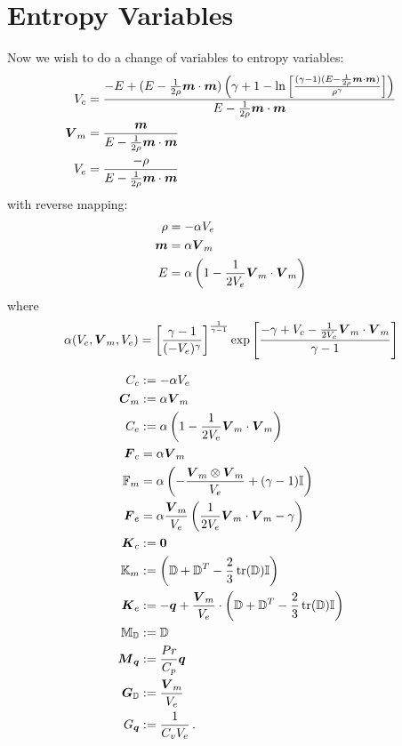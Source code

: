 \documentclass[Dissertation.tex]{subfiles}
\begin{document}
\section{Entropy Variables}
Now we wish to do a change of variables to entropy variables:
\begin{align*}
V_c&=\frac{-E+(E-\frac{1}{2\rho}\boldsymbol m\cdot\boldsymbol m)\left( \gamma+1-\ln\left[ \frac{(\gamma-1)(E-\frac{1}{2\rho}\boldsymbol m\cdot\boldsymbol m)}{\rho^\gamma} \right] \right)}
{E-\frac{1}{2\rho}\boldsymbol m\cdot\boldsymbol m}\\
\boldsymbol V_m&=\frac{\boldsymbol m}{E-\frac{1}{2\rho}\boldsymbol m\cdot\boldsymbol m}\\
V_e&=\frac{-\rho}{E-\frac{1}{2\rho}\boldsymbol m\cdot\boldsymbol m}\\
\end{align*}
with reverse mapping:
\begin{align*}
\rho&=-\alpha V_e\\
\boldsymbol m&=\alpha\boldsymbol V_m\\
E&=\alpha\left( 1-\frac{1}{2V_e}\boldsymbol V_m\cdot\boldsymbol V_m \right)\\
\end{align*}
where 
\[
\alpha(V_c,\boldsymbol V_m,V_e)=\left[ \frac{\gamma-1}{(-V_e)^\gamma} \right]^{\frac{1}{\gamma-1}}\exp\left[ \frac{-\gamma+V_c-\frac{1}{2V_e}\boldsymbol V_m\cdot\boldsymbol V_m}{\gamma-1} \right]
\]

\begin{align*}
C_c&:=-\alpha V_e\\
\boldsymbol C_m&:=\alpha\boldsymbol V_m\\
C_e&:=\alpha\left( 1-\frac{1}{2V_e}\boldsymbol V_m\cdot\boldsymbol V_m \right)\\
\boldsymbol F_c&=\alpha\boldsymbol V_m\\
\mathbb{F}_m&=\alpha\left( -\frac{\boldsymbol V_m\otimes\boldsymbol V_m}{V_e}+(\gamma-1)\mathbb{I} \right)\\
\boldsymbol F_e&=\alpha\frac{\boldsymbol V_m}{V_e}\left( \frac{1}{2V_e}\boldsymbol V_m\cdot\boldsymbol V_m-\gamma \right)\\
\boldsymbol K_c&:=\boldsymbol 0\\
\mathbb{K}_m&:=\left( \mathbb{D}+\mathbb{D}^T-\frac{2}{3}\operatorname*{tr}(\mathbb{D})\mathbb{I} \right)\\
\boldsymbol K_e&:=-\boldsymbol q+\frac{\boldsymbol V_m}{V_e}\cdot\left( \mathbb{D}+\mathbb{D}^T-\frac{2}{3}\operatorname*{tr}(\mathbb{D})\mathbb{I} \right)\\
\mathbb{M}_{\mathbb{D}}&:=\mathbb{D}\\
\boldsymbol M_{\boldsymbol q}&:=\frac{Pr}{C_p}\boldsymbol q\\
\boldsymbol G_{\mathbb{D}}&:=\frac{\boldsymbol V_m}{V_e}\\
G_{\boldsymbol q}&:=\frac{1}{C_vV_e}\,.
\end{align*}
\end{document}

